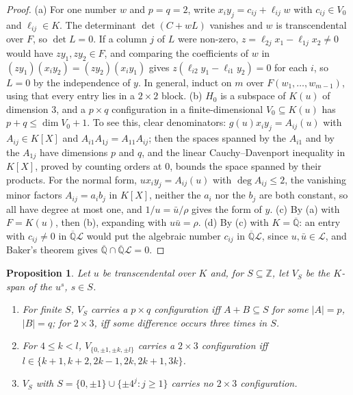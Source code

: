 \documentclass[11pt,a4paper]{article}
\theoremstyle{plain}
\newtheorem{proposition}[theorem]{Proposition}
\theoremstyle{definition}
\newcommand{\Z}{\mathbb{Z}}
\newcommand{\Alg}{\overline{\mathbb{Q}}}
\newcommand{\Logs}{\mathcal{L}}
\begin{document}
\begin{proof}
(a) For one number $w$ and $p=q=2$, write $x_{i}y_{j}=c_{ij}+\ell_{ij}w$ with $c_{ij}\in V_{0}$ and
$\ell_{ij}\in K$. The determinant $\det(C+wL)$ vanishes and $w$ is transcendental over $F$, so $\det L=0$. If a
column $j$ of $L$ were non-zero, $z=\ell_{2j}x_{1}-\ell_{1j}x_{2}\neq0$ would have $zy_{1},zy_{2}\in F$, and
comparing the coefficients of $w$ in $(zy_{1})(x_{i}y_{2})=(zy_{2})(x_{i}y_{1})$ gives
$z(\ell_{i2}y_{1}-\ell_{i1}y_{2})=0$ for each $i$, so $L=0$ by the independence of $y$. In general, induct on
$m$ over $F(w_{1},\dots,w_{m-1})$, using that every entry lies in a $2\times2$ block.
(b) $H_{0}$ is a subspace of $K(u)$ of dimension $3$, and a $p\times q$ configuration in a finite-dimensional
$V_{0}\subseteq K(u)$ has $p+q\le\dim V_{0}+1$. To see this, clear denominators: $g(u)x_{i}y_{j}=A_{ij}(u)$ with
$A_{ij}\in K[X]$ and $A_{i1}A_{1j}=A_{11}A_{ij}$; then the spaces spanned by the $A_{i1}$ and by the $A_{1j}$
have dimensions $p$ and $q$, and the linear Cauchy--Davenport inequality in $K[X]$, proved by counting
orders at $0$, bounds the space spanned by their products. For the normal form, $ux_{i}y_{j}=A_{ij}(u)$ with
$\deg A_{ij}\le2$, the vanishing minor factors $A_{ij}=a_{i}b_{j}$ in $K[X]$, neither the $a_{i}$ nor the
$b_{j}$ are both constant, so all have degree at most one, and $1/u=\bar u/\rho$ gives the form of $y$.
(c) By (a) with $F=K(u)$, then (b), expanding with $u\bar u=\rho$.
(d) By (c) with $K=\Alg$: an entry with $c_{ij}\neq0$ in $\Alg\Logs$ would put the algebraic number $c_{ij}$ in
$\Alg\Logs$, since $u,\bar u\in\Logs$, and Baker's theorem gives $\Alg\cap\Alg\Logs=0$.
\end{proof}

\begin{proposition}\label{prop:laurent}
Let $u$ be transcendental over $K$ and, for $S\subseteq\Z$, let $V_{S}$ be the $K$-span of the $u^{s}$, $s\in S$.
\begin{enumerate}[label=\textup{(\alph*)}]
\item For finite $S$, $V_{S}$ carries a $p\times q$ configuration iff $A+B\subseteq S$ for some $|A|=p$,
$|B|=q$; for $2\times3$, iff some difference occurs three times in $S$.
\item For $4\le k<l$, $V_{\{0,\pm1,\pm k,\pm l\}}$ carries a $2\times3$ configuration iff
$l\in\{k+1,k+2,2k-1,2k,2k+1,3k\}$.
\item $V_{S}$ with $S=\{0,\pm1\}\cup\{\pm4^{j}:j\ge1\}$ carries no $2\times3$ configuration.
\end{enumerate}
\end{proposition}
\end{document}
